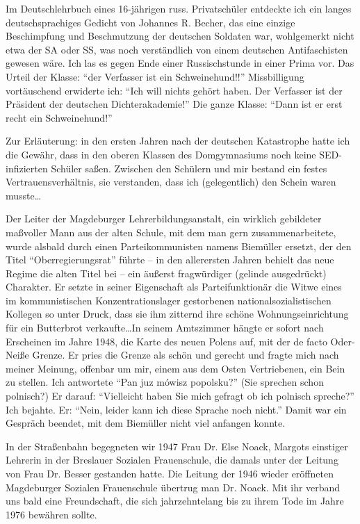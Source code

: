 \documentclass[a5paper,pagesize,10pt,twoside=true]{scrbook}
\begin{document}
Im Deutschlehrbuch eines 16-jährigen russ. Privatschüler entdeckte ich ein langes deutschsprachiges Gedicht von Johannes R. Becher, das eine einzige Beschimpfung und Beschmutzung der deutschen Soldaten war, wohlgemerkt nicht etwa der SA oder SS, was noch verständlich von einem deutschen Antifaschisten gewesen wäre. Ich las es gegen Ende einer Russischstunde in einer Prima vor. Das Urteil der Klasse: \enquote{der Verfasser ist ein Schweinehund!!} Missbilligung vortäuschend erwiderte ich: \enquote{Ich will nichts gehört haben. Der Verfasser ist der Präsident der deutschen Dichterakademie!} Die ganze Klasse: \enquote{Dann ist er erst recht ein Schweinehund!}

Zur Erläuterung: in den ersten Jahren nach der deutschen Katastrophe hatte ich die Gewähr, dass in den oberen Klassen des Domgymnasiums noch keine SED-infizierten Schüler saßen. Zwischen den Schülern und mir bestand ein festes Vertrauensverhältnis, sie verstanden, dass ich (gelegentlich) den Schein waren musste\dots

Der Leiter der Magdeburger Lehrerbildungsanstalt, ein wirklich gebildeter maßvoller Mann aus der alten Schule, mit dem man gern zusammenarbeitete, wurde alsbald durch einen Parteikommunisten namens Biemüller ersetzt, der den Titel \enquote{Oberregierungsrat} führte -- in den allerersten Jahren behielt das neue Regime die alten Titel bei -- ein äußerst fragwürdiger (gelinde ausgedrückt) Charakter. Er setzte in seiner Eigenschaft als Parteifunktionär die Witwe eines im kommunistischen Konzentrationslager gestorbenen nationalsozialistischen Kollegen so unter Druck, dass sie ihm zitternd ihre schöne Wohnungseinrichtung für ein Butterbrot verkaufte\dots In seinem Amtszimmer hängte er sofort nach Erscheinen im Jahre 1948, die Karte des neuen Polens auf, mit der de facto Oder-Neiße Grenze. Er pries die Grenze als schön und gerecht und fragte mich nach meiner Meinung, offenbar um mir, einem aus dem Osten Vertriebenen, ein Bein zu stellen. Ich antwortete \enquote{Pan juz mówisz popolsku?} (Sie sprechen schon polnisch?) Er darauf: \enquote{Vielleicht haben Sie mich gefragt ob ich polnisch spreche?} Ich bejahte. Er: \enquote{Nein, leider kann ich diese Sprache noch nicht.} Damit war ein Gespräch beendet, mit dem Biemüller nicht viel anfangen konnte.

In der Straßenbahn begegneten wir 1947 Frau Dr. Else Noack, Margots einstiger Lehrerin in der Breslauer Sozialen Frauenschule, die damals unter der Leitung von Frau Dr. Besser gestanden hatte. Die Leitung der 1946 wieder eröffneten Magdeburger Sozialen Frauenschule übertrug man Dr. Noack. Mit ihr verband uns bald eine Freundschaft, die sich jahrzehntelang bis zu ihrem Tode im Jahre 1976 bewähren sollte.
\end{document}
